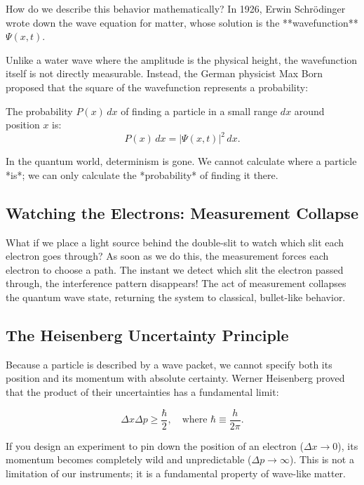 How do we describe this behavior mathematically? In 1926, Erwin Schrödinger wrote down the wave equation for matter, whose solution is the **wavefunction** $\Psi(x,t)$. 

Unlike a water wave where the amplitude is the physical height, the wavefunction itself is not directly measurable. Instead, the German physicist Max Born proposed that the square of the wavefunction represents a probability:
\begin{keybox}
The probability $P(x)\,dx$ of finding a particle in a small range $dx$ around position $x$ is:
\begin{equation}
    P(x)\,dx = |\Psi(x,t)|^2\,dx.
\end{equation}
\end{keybox}
In the quantum world, determinism is gone. We cannot calculate where a particle *is*; we can only calculate the *probability* of finding it there.

\subsection{Watching the Electrons: Measurement Collapse}

What if we place a light source behind the double-slit to watch which slit each electron goes through? 
As soon as we do this, the measurement forces each electron to choose a path. The instant we detect which slit the electron passed through, the interference pattern disappears! The act of measurement collapses the quantum wave state, returning the system to classical, bullet-like behavior.

\subsection{The Heisenberg Uncertainty Principle}

Because a particle is described by a wave packet, we cannot specify both its position and its momentum with absolute certainty. Werner Heisenberg proved that the product of their uncertainties has a fundamental limit:
\begin{keybox}
\begin{equation}
    \Delta x \Delta p \ge \frac{\hbar}{2}, \quad \text{where } \hbar \equiv \frac{h}{2\pi}.
\end{equation}
\end{keybox}
If you design an experiment to pin down the position of an electron ($\Delta x \to 0$), its momentum becomes completely wild and unpredictable ($\Delta p \to \infty$). This is not a limitation of our instruments; it is a fundamental property of wave-like matter.


